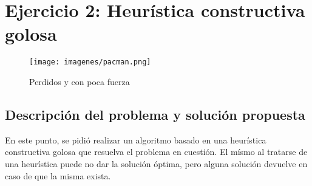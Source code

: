 \section{Ejercicio 2: Heurística constructiva golosa}

  \begin{figure}[ht]
    \begin{center}
      \texttt{[image: imagenes/pacman.png]}
      \caption{Perdidos y con poca fuerza}
    \end{center}
  \end{figure}

    \subsection{Descripción del problema y solución propuesta}
        En este punto, se pidió realizar un algoritmo basado en una heurística constructiva golosa que resuelva el problema en cuestión. El mísmo al tratarse de una heurística puede no dar la solución óptima, pero alguna solución devuelve en caso de que la misma exista.

